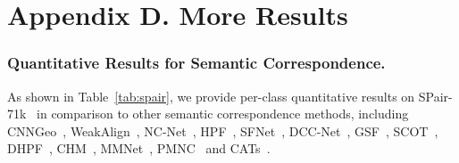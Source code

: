 \section*{Appendix D. More Results}

\vspace{-10pt}
\subsubsection{Quantitative Results for Semantic Correspondence.}
As shown in Table~\ref{tab:spair}, we provide per-class quantitative results on  SPair-71k~\cite{min2019spair} in comparison to other semantic correspondence methods, including CNNGeo~\cite{rocco2017convolutional}, WeakAlign~\cite{rocco2018end}, NC-Net~\cite{Rocco18b}, HPF~\cite{min2019hyperpixel}, SFNet~\cite{lee2019sfnet}, DCC-Net~\cite{huang2019dynamic}, GSF~\cite{jeon2020guided}, SCOT~\cite{liu2020semantic}, DHPF~\cite{min2020learning}, CHM~\cite{min2021convolutional}, MMNet~\cite{zhao2021multi}, PMNC~\cite{Lee_2021_CVPR} and CATs~\cite{cho2021semantic}. \vspace{-10pt}

